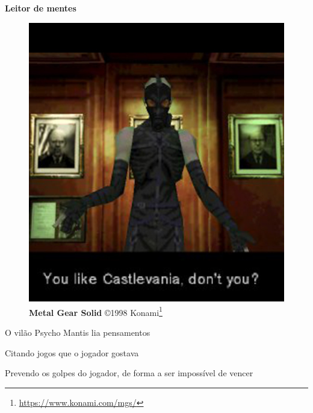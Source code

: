 \expandafter\documentclass\expandafter[table, usenames, svgnames, dvipsnames, \classopts]{beamer}
\begin{document}
\begin{frame}{\textbf{Leitor de mentes}}

	\begin{figure}
		\centering
		\includegraphics[draft,height=0.4\paperheight]{metal-gear}
		\caption{\tiny \textbf{Metal Gear Solid} \copyright{1998} Konami\footnote{\url{https://www.konami.com/mgs/}}}
	\end{figure}

	\vspace{-1em}

	\begin{outline}
		\1 O vilão Psycho Mantis lia pensamentos
		
		\1 Citando jogos que o jogador gostava

		\1 Prevendo os golpes do jogador, de forma a ser impossível de vencer
	\end{outline}

\end{frame}
\end{document}
